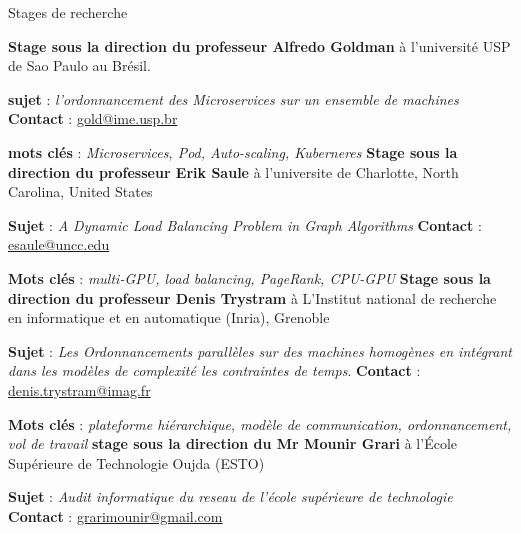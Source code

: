 \begin{rubric}{Stages de recherche}



     \textbf{Stage sous la direction du professeur Alfredo Goldman} à l'université USP de Sao Paulo au Brésil.
	\par \textbf{sujet} : \emph{l'ordonnancement des Microservices sur un ensemble de machines}
	\textbf{Contact} : \href{mailto:gold@ime.usp.br}{gold@ime.usp.br}
	\par \textbf{mots clés} : \emph{Microservices, Pod, Auto-scaling, Kuberneres}
%
	\textbf{Stage sous la direction du professeur Erik Saule} à l’universite de Charlotte, North Carolina, United States
	\par \textbf{Sujet} : \emph{A Dynamic Load Balancing Problem in Graph Algorithms}
	\textbf{Contact} : \href{mailto:esaule@uncc.edu}{esaule@uncc.edu}
	\par \textbf{Mots clés} : \emph{multi-GPU, load balancing, PageRank, CPU-GPU}
%
%
	\textbf{Stage sous la direction du professeur Denis Trystram} à L'Institut national de recherche en informatique et en automatique (Inria), Grenoble
	\par	\textbf{Sujet} : \emph{Les Ordonnancements parallèles sur des machines homogènes en intégrant dans les modèles de complexité les contraintes de temps}.
	\textbf{Contact} :  \href{mailto:denis.trystram@imag.fr}{denis.trystram@imag.fr}
	\par \textbf{Mots clés} : \emph{plateforme hiérarchique, modèle de communication, ordonnancement, vol de travail}
%
%
	\textbf{stage sous la direction du Mr Mounir Grari} à l’École Supérieure de Technologie Oujda (ESTO)
	\par	\textbf{Sujet} : \emph{Audit informatique du reseau de l'école supérieure de technologie}
	\textbf{Contact} :  \href{mailto:grarimounir@gmail.com}{grarimounir@gmail.com}
\end{rubric}
